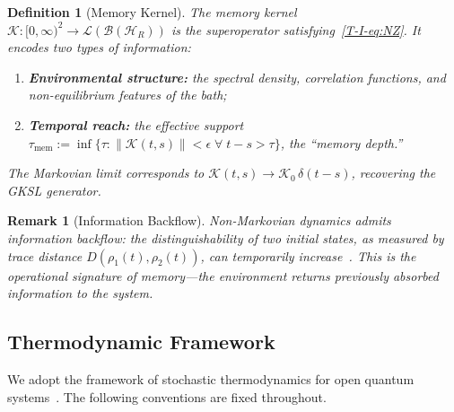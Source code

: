 \documentclass[12pt,a4paper,openany]{book}
\newtheorem{definition}[theorem]{Definition}
\newtheorem{remark}[theorem]{Remark}
\begin{document}
\begin{definition}[Memory Kernel]
\label{T-I-def:kernel}
The memory kernel $\mathcal{K}: [0,\infty)^2 \to
\mathcal{L}(\mathcal{B}(\mathcal{H}_R))$ is the superoperator
satisfying~\eqref{T-I-eq:NZ}. It encodes two types of information:
\begin{enumerate}
\item \textbf{Environmental structure:} the spectral density,
  correlation functions, and non-equilibrium features of the bath;
\item \textbf{Temporal reach:} the effective support
  $\tau_{\mathrm{mem}} := \inf\{\tau : \|\mathcal{K}(t,s)\| < \epsilon
  \;\forall\; t - s > \tau\}$, the ``memory depth.''
\end{enumerate}
The Markovian limit corresponds to
$\mathcal{K}(t,s) \to \mathcal{K}_0\, \delta(t-s)$,
recovering the GKSL generator.
\end{definition}

\begin{remark}[Information Backflow]
\label{T-I-rem:backflow}
Non-Markovian dynamics admits \emph{information backflow}:
the distinguishability of two initial states, as measured by
trace distance $D(\rho_1(t), \rho_2(t))$, can temporarily
increase~\cite{BreuerLainePiilo2009}. This is the operational
signature of memory---the environment returns previously
absorbed information to the system.
\end{remark}

\subsection{Thermodynamic Framework}
\label{T-I-subsec:thermo}

We adopt the framework of stochastic thermodynamics for open
quantum systems~\cite{EspositoLindenbergVandenBroeck2010}.
The following conventions are fixed throughout.
\end{document}
